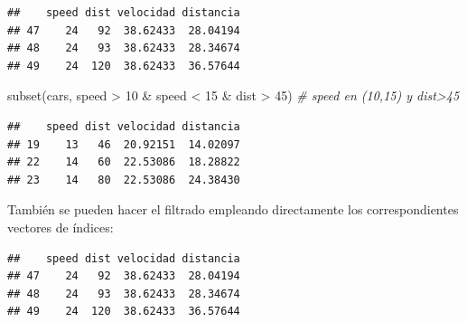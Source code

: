 \documentclass[
]{book}
\newenvironment{Shaded}{\begin{snugshade}}{\end{snugshade}}
\newcommand{\CommentTok}[1]{\textcolor[rgb]{0.56,0.35,0.01}{\textit{#1}}}
\newcommand{\DecValTok}[1]{\textcolor[rgb]{0.00,0.00,0.81}{#1}}
\newcommand{\FunctionTok}[1]{\textcolor[rgb]{0.00,0.00,0.00}{#1}}
\newcommand{\NormalTok}[1]{#1}
\newcommand{\OtherTok}[1]{\textcolor[rgb]{0.56,0.35,0.01}{#1}}
\newcommand{\SpecialCharTok}[1]{\textcolor[rgb]{0.00,0.00,0.00}{#1}}
\theoremstyle{break}
\theoremstyle{nonumberplain}
\begin{document}
\begin{verbatim}
##    speed dist velocidad distancia
## 47    24   92  38.62433  28.04194
## 48    24   93  38.62433  28.34674
## 49    24  120  38.62433  36.57644
\end{verbatim}

\begin{Shaded}
\begin{Highlighting}[]
\FunctionTok{subset}\NormalTok{(cars, speed }\SpecialCharTok{\textgreater{}} \DecValTok{10} \SpecialCharTok{\&}\NormalTok{ speed }\SpecialCharTok{\textless{}} \DecValTok{15} \SpecialCharTok{\&}\NormalTok{ dist }\SpecialCharTok{\textgreater{}} \DecValTok{45}\NormalTok{) }\CommentTok{\# speed en (10,15) y dist\textgreater{}45}
\end{Highlighting}
\end{Shaded}

\begin{verbatim}
##    speed dist velocidad distancia
## 19    13   46  20.92151  14.02097
## 22    14   60  22.53086  18.28822
## 23    14   80  22.53086  24.38430
\end{verbatim}

También se pueden hacer el filtrado empleando directamente los
correspondientes vectores de índices:

\begin{Shaded}
\end{Shaded}

\begin{verbatim}
##    speed dist velocidad distancia
## 47    24   92  38.62433  28.04194
## 48    24   93  38.62433  28.34674
## 49    24  120  38.62433  36.57644
\end{verbatim}

\begin{Shaded}
\end{Shaded}
\end{document}
